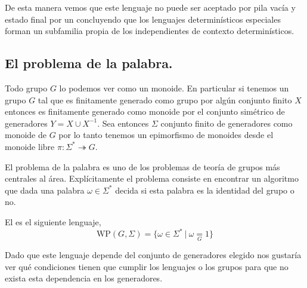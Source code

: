 \documentclass[tesis.tex]{subfiles}
\begin{document}
\begin{ej}
	De esta manera vemos que este lenguaje no puede ser aceptado por pila vacía y estado final por un \APD concluyendo que los lenguajes determinísticos especiales forman un subfamilia propia de los independientes de contexto determinísticos.
	
\end{ej}


\subsection{El problema de la palabra.}

Todo grupo $G$ lo podemos ver como un monoide. 
En particular si tenemos un grupo $G$ tal que es finitamente generado como grupo por algún conjunto finito $X$ entonces es finitamente generado como monoide por el conjunto simétrico de generadores $Y = X \cup X^{-1}$.
Sea entonces $\Sigma$ conjunto finito de generadores como monoide de $G$
por lo tanto tenemos un epimorfismo de monoides desde el monoide libre $\pi: \Sigma^* \twoheadrightarrow  G$. 

El problema de la palabra es uno de los problemas de teoría de grupos más centrales al área. Explícitamente el problema consiste en encontrar un algoritmo que dada una palabra $\omega \in \Sigma^*$ decida si esta palabra es la identidad del grupo o no. 

\begin{deff}
El  es el siguiente lenguaje,	
\[ \text{WP} (G, \Sigma) = \{ \omega \in \Sigma^* \ | \ \omega \underset{G}= 1 \}\]
\end{deff}

Dado que este lenguaje depende del conjunto de generadores elegido nos gustaría ver qué condiciones tienen que cumplir los lenguajes o los grupos para que no exista esta dependencia en los generadores.
\end{document}
